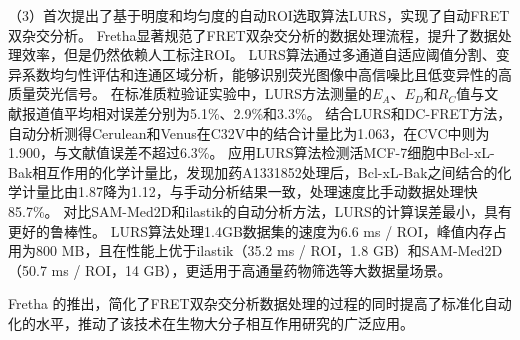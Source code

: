\begin{cabstract}
（3）首次提出了基于明度和均匀度的自动ROI选取算法LURS，实现了自动FRET双杂交分析。
Fretha显著规范了FRET双杂交分析的数据处理流程，提升了数据处理效率，但是仍然依赖人工标注ROI。
LURS算法通过多通道自适应阈值分割、变异系数均匀性评估和连通区域分析，能够识别荧光图像中高信噪比且低变异性的高质量荧光信号。
在标准质粒验证实验中，LURS方法测量的$E_{A}$、$E_{D}$和$R_C$值与文献报道值平均相对误差分别为5.1\%、2.9\%和3.3\%。
结合LURS和DC-FRET方法，自动分析测得Cerulean和Venus在C32V中的结合计量比为1.063，在CVC中则为1.900，与文献值误差不超过6.3\%。
应用LURS算法检测活MCF-7细胞中Bcl-xL-Bak相互作用的化学计量比，发现加药A1331852处理后，Bcl-xL-Bak之间结合的化学计量比由1.87降为1.12，与手动分析结果一致，处理速度比手动数据处理快85.7\%。
对比SAM-Med2D和ilastik的自动分析方法，LURS的计算误差最小，具有更好的鲁棒性。
LURS算法处理1.4GB数据集的速度为6.6 ms / ROI，峰值内存占用为800 MB，且在性能上优于ilastik（35.2 ms / ROI，1.8 GB）和SAM-Med2D（50.7 ms / ROI，14 GB），更适用于高通量药物筛选等大数据量场景。

Fretha 的推出，简化了FRET双杂交分析数据处理的过程的同时提高了标准化自动化的水平，推动了该技术在生物大分子相互作用研究的广泛应用。
\end{cabstract}
\vspace{3pt}
